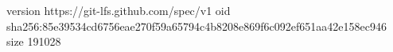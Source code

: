 version https://git-lfs.github.com/spec/v1
oid sha256:85e39534cd6756eae270f59a65794c4b8208e869f6c092ef651aa42e158ec946
size 191028
